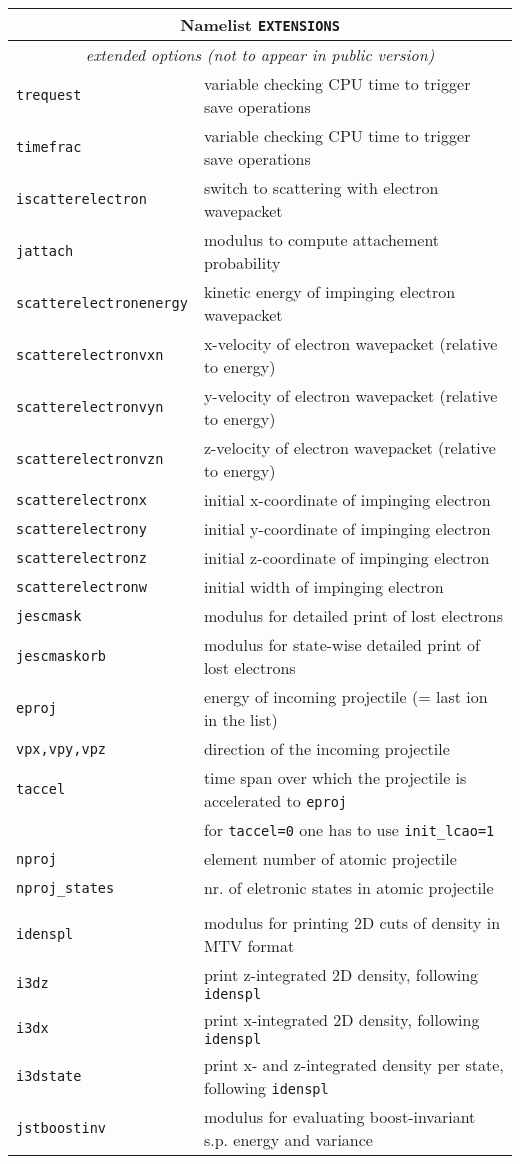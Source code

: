 \documentclass[12pt]{article}
\begin{document}
\begin{tabular}{ll}
\hline
\multicolumn{2}{c}{Namelist {\tt EXTENSIONS}} in {\tt for005.<name>} \\
\hline
\multicolumn{2}{c}{\it extended options (not to appear in public version)} \\
\hline
{\tt trequest} &  variable checking CPU time to trigger save
operations \\
{\tt timefrac} &  variable checking CPU time to trigger save operations  \\
{\tt iscatterelectron} &  switch to scattering with electron wavepacket\\
{\tt jattach} &  modulus to compute attachement probability\\
{\tt scatterelectronenergy} &  kinetic energy of impinging electron wavepacket\\
{\tt scatterelectronvxn} &  x-velocity  of electron
wavepacket (relative to energy)\\
{\tt scatterelectronvyn} &  y-velocity  of electron
wavepacket (relative to energy) \\
{\tt scatterelectronvzn} &  z-velocity  of electron
wavepacket (relative to energy) \\
{\tt scatterelectronx} & initial x-coordinate of impinging electron \\
{\tt scatterelectrony} & initial y-coordinate of impinging electron  \\
{\tt scatterelectronz} & initial z-coordinate of impinging electron  \\
{\tt scatterelectronw} & initial width  of impinging electron \\
{\tt jescmask} & modulus for detailed print of lost electrons \\
{\tt jescmaskorb} & modulus for state-wise detailed print of lost electrons \\
{\tt eproj}& energy of incoming projectile (= last ion in the list)
\\
{\tt vpx,vpy,vpz}& direction of the incoming projectile
\\
{\tt taccel}& time span over which the projectile is accelerated to
             {\tt eproj}\\
& for {\tt taccel=0} one has to use {\tt init\_lcao=1}\\
{\tt nproj} & element number of atomic projectile \\
{\tt nproj\_states} & nr. of eletronic states in atomic projectile \\
\\
{\tt idenspl} & modulus for printing 2D cuts of density in MTV format\\
{\tt i3dz} &  print z-integrated 2D density, following {\tt idenspl}\\
{\tt i3dx} &  print x-integrated 2D density, following {\tt idenspl}\\
{\tt i3dstate} & print  x- and z-integrated density per state, following {\tt idenspl}\\
{\tt jstboostinv} & modulus for evaluating boost-invariant s.p. energy
and variance\\
\hline
\end{tabular}
\end{document}

